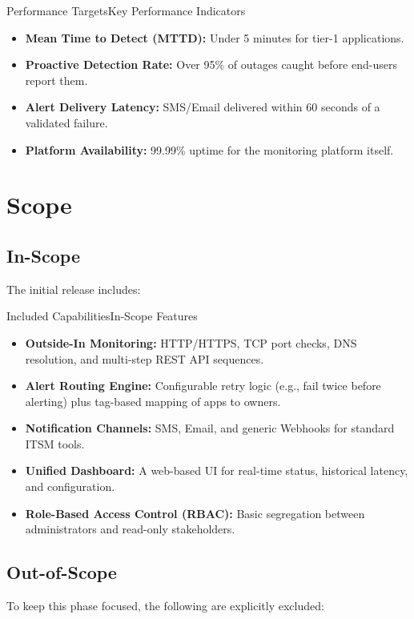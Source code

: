 \documentclass[11pt,a4paper]{article}
\begin{document}
\begin{recbox}{Performance Targets}{Key Performance Indicators}
\begin{itemize}
  \item \textbf{Mean Time to Detect (MTTD):} Under 5 minutes for tier-1 applications.
  \item \textbf{Proactive Detection Rate:} Over 95\% of outages caught before end-users report them.
  \item \textbf{Alert Delivery Latency:} SMS/Email delivered within 60 seconds of a validated failure.
  \item \textbf{Platform Availability:} 99.99\% uptime for the monitoring platform itself.
\end{itemize}
\end{recbox}


\section{Scope}

\subsection{In-Scope}
The initial release includes:

\begin{recbox}{Included Capabilities}{In-Scope Features}
\begin{itemize}
  \item \textbf{Outside-In Monitoring:} HTTP/HTTPS, TCP port checks, DNS resolution, and multi-step REST API sequences.
  \item \textbf{Alert Routing Engine:} Configurable retry logic (e.g., fail twice before alerting) plus tag-based mapping of apps to owners.
  \item \textbf{Notification Channels:} SMS, Email, and generic Webhooks for standard ITSM tools.
  \item \textbf{Unified Dashboard:} A web-based UI for real-time status, historical latency, and configuration.
  \item \textbf{Role-Based Access Control (RBAC):} Basic segregation between administrators and read-only stakeholders.
\end{itemize}
\end{recbox}

\subsection{Out-of-Scope}
To keep this phase focused, the following are explicitly excluded:
\end{document}
